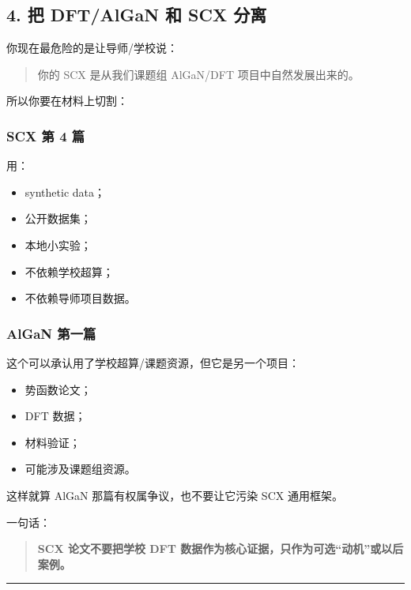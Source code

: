 \documentclass[
  12pt,
]{ctexart}
\providecommand{\tightlist}{%
  \setlength{\itemsep}{0pt}\setlength{\parskip}{0pt}}
\begin{document}
\subsection{4. 把 DFT/AlGaN 和 SCX
分离}\label{ux628a-dftalgan-ux548c-scx-ux5206ux79bb}

你现在最危险的是让导师/学校说：

\begin{quote}
你的 SCX 是从我们课题组 AlGaN/DFT 项目中自然发展出来的。
\end{quote}

所以你要在材料上切割：

\subsubsection{SCX 第 4 篇}\label{scx-ux7b2c-4-ux7bc7}

用：

\begin{itemize}
\tightlist
\item
  synthetic data；
\item
  公开数据集；
\item
  本地小实验；
\item
  不依赖学校超算；
\item
  不依赖导师项目数据。
\end{itemize}

\subsubsection{AlGaN 第一篇}\label{algan-ux7b2cux4e00ux7bc7}

这个可以承认用了学校超算/课题资源，但它是另一个项目：

\begin{itemize}
\tightlist
\item
  势函数论文；
\item
  DFT 数据；
\item
  材料验证；
\item
  可能涉及课题组资源。
\end{itemize}

这样就算 AlGaN 那篇有权属争议，也不要让它污染 SCX 通用框架。

一句话：

\begin{quote}
\textbf{SCX 论文不要把学校 DFT
数据作为核心证据，只作为可选``动机''或以后案例。}
\end{quote}

\begin{center}\rule{0.5\linewidth}{0.5pt}\end{center}
\end{document}
